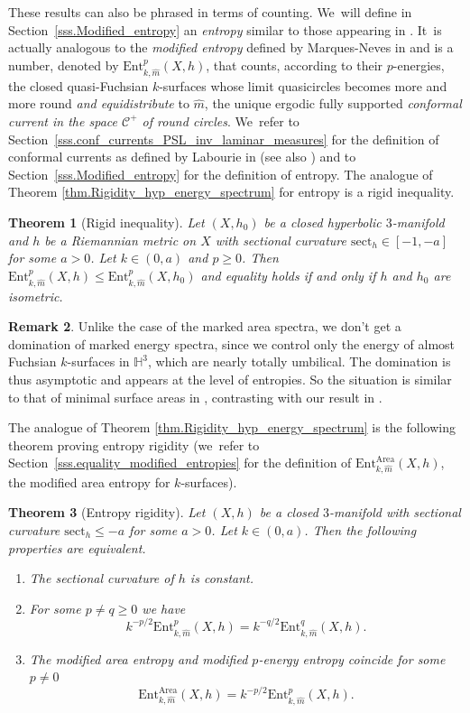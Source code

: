 \documentclass[JEP,XML,SOM,Unicode,NoEqCountersInSection,published]{cedram}
\newcommand{\ksurfaces}{$k$\nobreakdash-surfaces\xspace}
\theoremstyle{plain}
\newtheorem{theorem}{Theorem}[section]
\theoremstyle{definition}
\newtheorem{remark}[theorem]{Remark}
\newcommand\Hyp{\mathbb{H}^3}
\newcommand{\cC}{{\mathcal C}}
\newcommand{\sect}{\mathrm{sect}}
\newcommand{\Ent}{\mathrm{Ent}}
\begin{document}
These results can also be phrased in terms of counting. We~will define in Section~\ref{sss.Modified_entropy} an \emph{entropy} similar to those appearing in \cite{ALS,CMN}. It~is actually analogous to the \emph{modified entropy} defined by Marques-Neves in \cite{MN_currents} and is a number, denoted by $\Ent^p_{k,\hat m}(X,h)$, that counts, according to their $p$-energies, the closed quasi-Fuchsian \ksurfaces whose limit quasicircles becomes more and more round \emph{and equidistribute} to $\hat m$, the unique ergodic fully supported \emph{conformal current in the space $\cC^+$ of round circles}. We~refer to Section~\ref{sss.conf_currents_PSL_inv_laminar_measures} for the definition of conformal currents as defined by Labourie in \cite{LabourieBourbaki} (see also \cite{ALS,MN_currents}) and to Section~\ref{sss.Modified_entropy} for the definition of entropy. The analogue of Theorem \ref{thm.Rigidity_hyp_energy_spectrum} for entropy is a rigid inequality.

\begin{theorem}[Rigid inequality]\label{th.rigidity_entropy}
Let $(X,h_0)$ be a closed hyperbolic $3$\nobreakdash-manifold and $h$ be a Riemannian metric on $X$ with sectional curvature $\sect_h\in[-1,-a]$ for some $a>0$. Let $k\in (0,a)$ and $p\geq 0$. Then $\Ent^p_{k,\hat m}(X,h)\leq\Ent^p_{k,\hat m}(X,h_0)$ and equality holds if and only if $h$ and $h_0$ are isometric.
\end{theorem}

\begin{remark}
Unlike the case of the marked area spectra, we don't get a domination of marked energy spectra, since we control only the energy of almost Fuchsian $k$\nobreakdash-surfaces in $\Hyp$, which are nearly totally umbilical. The domination is thus asymptotic and appears at the level of entropies. So the situation is similar to that of minimal surface areas in \cite{CMN}, contrasting with our result in \cite{ALS}.
\end{remark}

The analogue of Theorem \ref{thm.Rigidity_hyp_energy_spectrum} is the following theorem proving entropy rigidity (we~refer to Section~\ref{sss.equality_modified_entropies} for the definition of $\Ent^\mathrm{Area}_{k,\hat m}(X,h)$, the modified area entropy for \ksurfaces).

\begin{theorem}[Entropy rigidity]\label{equality_energy_area}
Let $(X,h)$ be a closed $3$\nobreakdash-manifold with sectional curvature $\sect_h\leq -a$ for some $a>0$. Let $k\in (0,a)$. Then the following properties are equivalent.
\begin{enumerate}
\item The sectional curvature of $h$ is constant.
\item For some $p\neq q\geq 0$ we have
\[
k^{-p/2} \Ent^p_{k,\hat m}(X,h)=k^{-q/2}\Ent^q_{k,\hat m}(X,h).
\]

\item The modified area entropy and modified $p$-energy entropy coincide for some $p\neq 0$
\[
\Ent^\mathrm{Area}_{k,\hat m}(X,h)=k^{-p/2}\Ent^p_{k,\hat m}(X,h).
\]
\end{enumerate}
\end{theorem}
\end{document}
